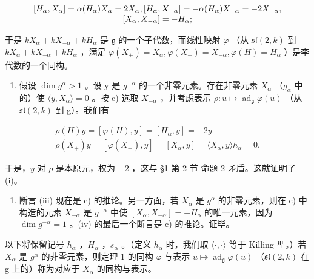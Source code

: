 \[
\begin{array}{c} [ H _ {\alpha}, X _ {\alpha} ] = \alpha (H _ {\alpha}) X _ {\alpha} = 2 X _ {\alpha}, [ H _ {\alpha}, X _ {- \alpha} ] = - \alpha (H _ {\alpha}) X _ {- \alpha} = - 2 X _ {- \alpha}, \\ \relax [ X _ {\alpha}, X _ {- \alpha} ] = - H _ {\alpha}; \end{array}
\]

于是 \(kX_{\alpha} + kX_{-\alpha} + kH_{\alpha}\) 是 \(\mathfrak{g}\) 的一个子代数，而线性映射 \(\varphi\) （从 \(\mathfrak{sl}(2,k)\) 到 \(kX_{\alpha} + kX_{-\alpha} + kH_{\alpha}\) ，满足 \(\varphi(X_{+}) = X_{\alpha}, \varphi(X_{-}) = X_{-\alpha}, \varphi(H) = H_{\alpha}\) ）是李代数的一个同构。

\begin{enumerate}
\def\labelenumi{\alph{enumi})}
\setcounter{enumi}{3}
\tightlist
\item
  假设 \(\dim g^{\alpha} > 1\) 。设 y 是 \(g^{-\alpha}\) 的一个非零元素。存在非零元素 \(X_{\alpha}\) （\(g_{\alpha}\) 中的）使 \(\langle y, X_{\alpha} \rangle = 0\) 。按 c) 选取 \(X_{-\alpha}\) ，并考虑表示 \(\rho : u \mapsto \operatorname{ad}_{\mathfrak{g}} \varphi(u)\) （从 \(\mathfrak{sl}(2, k)\) 到 g）。我们有
\end{enumerate}

\[
\begin{array}{c} \rho (H) y = [ \varphi (H), y ] = [ H _ {\alpha}, y ] = - 2 y \\ \rho (X _ {+}) y = [ \varphi (X _ {+}), y ] = [ X _ {\alpha}, y ] = \langle X _ {\alpha}, y \rangle h _ {\alpha} = 0. \end{array}
\]

于是，\(y\) 对 \(\rho\) 是本原元，权为 \(-2\) ，这与 §1 第 2 节 命题 2 矛盾。这就证明了 (i)。

\begin{enumerate}
\def\labelenumi{\alph{enumi})}
\setcounter{enumi}{4}
\tightlist
\item
  断言 (iii) 现在是 c) 的推论。另一方面，若 \(X_{\alpha}\) 是 \(g^{\alpha}\) 的非零元素，则在 c) 中构造的元素 \(X_{-\alpha}\) 是 \(g^{-\alpha}\) 中使 \([X_{\alpha}, X_{-\alpha}] = -H_{\alpha}\) 的唯一元素，因为 \(\dim g^{-\alpha} = 1\) 。(iv) 的最后一个断言是 c) 的推论。证毕。
\end{enumerate}

以下将保留记号 \(h_{\alpha}\) ，\(H_{\alpha}\) ，\(s_{\alpha}\) 。（定义 \(h_{\alpha}\) 时，我们取 \(\langle\cdot,\cdot\rangle\) 等于 Killing 型。）若 \(X_{\alpha}\) 是 \(g^{\alpha}\) 的非零元素，则定理 1 的同构 \(\varphi\) 与表示 \(u \mapsto \operatorname{ad}_{\mathfrak{g}} \varphi(u)\) （\(\mathfrak{sl}(2,k)\) 在 g 上的）称为对应于 \(X_{\alpha}\) 的同构与表示。


